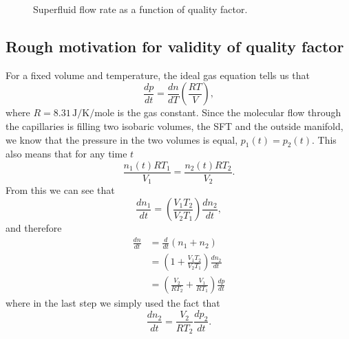 \documentclass[
12pt, %
letterpaper, %
oneside, %
headinclude, footinclude, %
BCOR5mm, %
]{scrartcl}
\newcommand{\mrm}[1]{\mathrm{#1}}
\begin{document}
\begin{figure}[t]
\begin{center}
\end{center}
\caption[Superfluid flow rate as a function of quality factor.]{Superfluid flow rate as a function of quality factor.}
\label{fig:quality_factor}
\end{figure} 

\subsection{Rough motivation for validity of quality factor}

For a fixed volume and temperature, the ideal gas equation tells us that 
\begin{equation}
\frac{dp}{dt} = \frac{dn}{dT} \left(\frac{RT}{V} \right),
\end{equation}
where $R = 8.31\,\mrm{J/K/mole}$ is the gas constant. Since the molecular flow through the capillaries is filling two isobaric volumes, the SFT and the outside manifold, we know that the pressure in the two volumes is equal, $p_1(t)=p_2(t)$. This also means that for any time $t$
\begin{equation}
\frac{n_1 (t) RT_1}{V_1} = \frac{n_2 (t) RT_2}{V_2}.
\end{equation}
From this we can see that 
\begin{equation}
\frac{d n_1}{dt} = \left( \frac{V_1T_2}{V_2T_1} \right) \frac{dn_2}{dt},
\end{equation}
and therefore
\begin{align}
\frac{d n}{dt} &= \frac{d}{dt}(n_1+n_2) \nonumber \\ 
&= \left( 1 + \frac{V_1T_2}{V_2T_1} \right) \frac{dn_2}{dt} \nonumber \\
&= \left( \frac{V_2}{RT_2} + \frac{V_1}{RT_1} \right) \frac{dp}{dt}
\label{eq:dndt}
\end{align}
where in the last step we simply used the fact that
\begin{equation}
\frac{dn_2}{dt} = \frac{V_2}{RT_2} \frac{dp_2}{dt}.
\end{equation}
\end{document}
